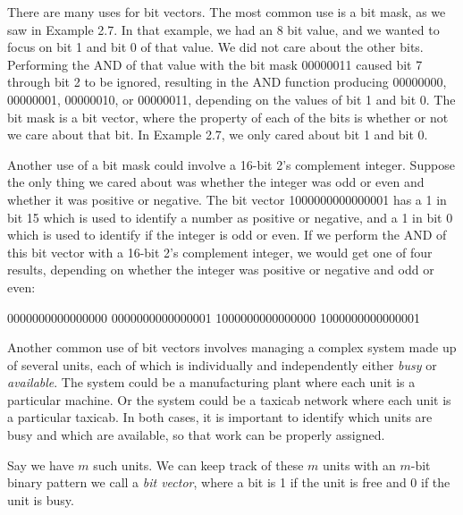 \documentclass{patt}
\begin{document}
There are many uses for bit vectors.  The most common use is a bit mask,
as we saw in Example 2.7.  In that example, we had an 8 bit value,
and we wanted to focus on bit 1 and bit 0 of that value.  We did not care about 
the other bits.  Performing the AND of that value with the bit mask 00000011 
caused 
bit 7 through bit 2 to be ignored, resulting in the AND function producing 
00000000, 00000001, 00000010, or 00000011, depending on the values of bit 1
and bit 0.
The bit mask is a bit vector, where the property of each of the bits is
whether or not we care about that bit.  In Example 2.7, we only cared about
bit 1 and bit 0.  

Another use of a bit mask could involve a 16-bit 2's complement integer.  
Suppose the only thing we cared about was whether the integer was odd or even 
and whether it was positive or negative.  The bit vector 1000000000000001 has 
a 1 in bit 15 which is used to identify a number as positive or negative, and 
a 1 in bit 0 which is used to identify if the integer is odd or even.  If we 
perform the AND of 
this bit vector with a 16-bit 2's complement integer, we would get one of four 
results, depending on whether the integer was positive or negative and odd 
or even: 

\begin{colorverbatim}
		0000000000000000
		0000000000000001
		1000000000000000
		1000000000000001
\end{colorverbatim}

Another common use of bit vectors involves managing a complex system made 
up of several units, each of which is individually and independently either 
{\em busy} or {\em available}.  The system could be a manufacturing plant 
where each unit is a particular machine.  Or the system could be a taxicab 
network where each unit is a particular taxicab.  In both cases, it is 
important to identify which units are busy and which are available, so that 
work can be properly assigned.

Say we have $m$ such units.  We can keep track of these $m$ units with 
an $m$-bit
binary pattern we call a {\em bit vector}, where a bit is 1 if the unit is
free and 0 if the unit is busy.
\end{document}
